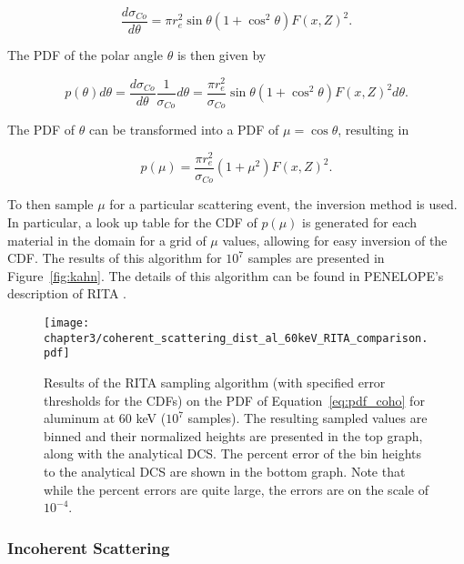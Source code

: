 \begin{equation}
    \frac{d\sigma_{Co}}{d\theta} = \pi r_e^2 \sin \theta (1 + \cos^2 \theta) F(x, Z)^2.
\end{equation}

\par The PDF of the polar angle $\theta$ is then given by

\begin{equation}
    p(\theta) d\theta = \frac{d\sigma_{Co}}{d\theta} \frac{1}{\sigma_{Co}} d\theta = \frac{\pi r_e^2}{\sigma_{Co}} \sin \theta (1 + \cos^2 \theta) F(x, Z)^2 d \theta.
\end{equation}

\par The PDF of $\theta$ can be transformed into a PDF of $\mu = \cos \theta$, resulting in

\begin{equation}
    p(\mu) = \frac{\pi r_e^2}{\sigma_{Co}} (1 + \mu^2) F(x, Z)^2.
    \label{eq:pdf_coho}
\end{equation}

\par To then sample $\mu$ for a particular scattering event, the inversion method is used. In particular, a look up table for the CDF of $p(\mu)$ is generated for each material in the domain for a grid of $\mu$ values, allowing for easy inversion of the CDF. The results of this algorithm for $10^7$ samples are presented in Figure~\ref{fig:kahn}. The details of this algorithm can be found in PENELOPE's description of RITA \cite{penelope-2018_2019}.

\begin{figure}[H]
    \centering
    \texttt{[image: chapter3/coherent\_scattering\_dist\_al\_60keV\_RITA\_comparison.pdf]}
    \caption{Results of the RITA sampling algorithm (with specified error thresholds for the CDFs) on the PDF of Equation~\ref{eq:pdf_coho} for aluminum at 60 keV ($10^7$ samples). The resulting sampled values are binned and their normalized heights are presented in the top graph, along with the analytical DCS. The percent error of the bin heights to the analytical DCS are shown in the bottom graph. Note that while the percent errors are quite large, the errors are on the scale of $10^{-4}$.}
    \label{fig:rita}
\end{figure}

\subsubsection{Incoherent Scattering}

